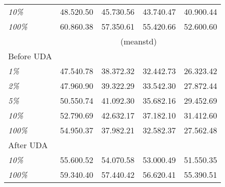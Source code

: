 \begin{table}[bt!]
{\begin{tabular}{l|cccc}
			\emph{10\%}             & 48.520.50                                                                                        & 45.730.56 & 43.740.47 & 40.900.44 \Tstrut  \\
			\emph{100\%}            & 60.860.38                                                                                        & 57.350.61 & 55.420.66 & 52.600.60 \Tstrut  \\
			\hline
			                        & \multicolumn{4}{c}{ (meanstd)} \Tstrut \Bstrut                                                             \\
			\hline
			Before UDA              &                                                                                                       &                & \Tstrut                                  \\
			\emph{1\%}              & 47.540.78                                                                                        & 38.372.32 & 32.442.73 & 26.323.42 \Tstrut  \\
			\emph{2\%}              & 47.960.90                                                                                        & 39.322.29 & 33.542.30 & 27.872.44 \Tstrut  \\
			\emph{5\%}              & 50.550.74                                                                                        & 41.092.30 & 35.682.16 & 29.452.69 \Tstrut  \\
			\emph{10\%}             & 52.790.69                                                                                        & 42.632.17 & 37.182.10 & 31.412.60 \Tstrut  \\
			\emph{100\%}            & 54.950.37                                                                                        & 37.982.21 & 32.582.37 & 27.562.48 \Tstrut  \\\hline
			After UDA               &                                                                                                       &                & \Tstrut                                  \\
			\emph{10\%}             & 55.600.52                                                                                        & 54.070.58 & 53.000.49 & 51.550.35 \Tstrut  \\
			\emph{100\%}            & 59.340.40                                                                                        & 57.440.42 & 56.620.41 & 55.390.51 \Tstrut  \\
			\hline
		\end{tabular}
	}
	\label{table:init-exps}
	\vspace{-1mm}
\end{table}


